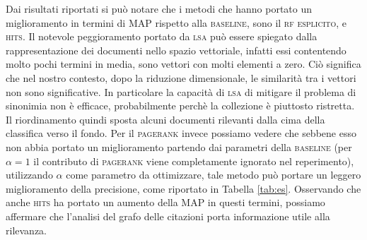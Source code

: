 Dai risultati riportati si pu\`o notare che i metodi che hanno portato un miglioramento in termini di MAP rispetto alla \textsc{baseline}, sono il \textsc{rf esplicito}, e \textsc{hits}. Il notevole peggioramento portato da \textsc{lsa} pu\`o essere spiegato dalla rappresentazione dei documenti nello spazio vettoriale, infatti essi contentendo molto pochi termini in media, sono vettori con molti elementi a zero. Ci\`o significa che nel nostro contesto, dopo la riduzione dimensionale, le similarit\`a tra i vettori non sono significative. In particolare la capacit\`a di \textsc{lsa} di mitigare il problema di sinonimia non \`e efficace, probabilmente perch\`e la collezione \`e piuttosto ristretta. Il riordinamento quindi sposta alcuni documenti rilevanti dalla cima della classifica verso il fondo. Per il \textsc{pagerank} invece possiamo vedere che sebbene esso non abbia portato un miglioramento partendo dai parametri della \textsc{baseline} (per $\alpha = 1$ il contributo di \textsc{pagerank} viene completamente ignorato nel reperimento), utilizzando $\alpha$ come parametro da ottimizzare, tale metodo pu\`o portare un leggero miglioramento della precisione, come riportato in Tabella \ref{tab:es}. Osservando che anche \textsc{hits} ha portato un aumento della MAP in questi termini, possiamo affermare che l'analisi del grafo delle citazioni porta informazione utile alla rilevanza.

